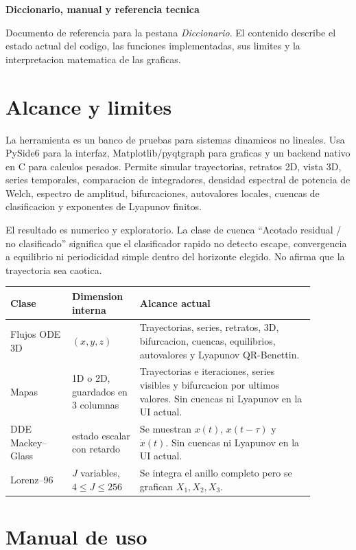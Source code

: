 \documentclass[11pt]{article}
\begin{document}
{\LARGE\bfseries Diccionario, manual y referencia tecnica}\par
{\small Documento de referencia para la pestana \emph{Diccionario}. El contenido describe el estado actual del codigo, las funciones implementadas, sus limites y la interpretacion matematica de las graficas.}\par
\vspace{0.8em}
\tableofcontents
\newpage

\section{Alcance y limites}

La herramienta es un banco de pruebas para sistemas dinamicos no lineales. Usa PySide6 para la interfaz, Matplotlib/pyqtgraph para graficas y un backend nativo en C para calculos pesados. Permite simular trayectorias, retratos 2D, vista 3D, series temporales, comparacion de integradores, densidad espectral de potencia de Welch, espectro de amplitud, bifurcaciones, autovalores locales, cuencas de clasificacion y exponentes de Lyapunov finitos.

El resultado es numerico y exploratorio. La clase de cuenca ``Acotado residual / no clasificado'' significa que el clasificador rapido no detecto escape, convergencia a equilibrio ni periodicidad simple dentro del horizonte elegido. No afirma que la trayectoria sea caotica.

\begin{longtable}{p{0.18\linewidth}p{0.19\linewidth}p{0.51\linewidth}}
\toprule
Clase & Dimension interna & Alcance actual \\
\midrule
\endhead
Flujos ODE 3D & $(x,y,z)$ & Trayectorias, series, retratos, 3D, bifurcacion, cuencas, equilibrios, autovalores y Lyapunov QR-Benettin. \\
Mapas & 1D o 2D, guardados en 3 columnas & Trayectorias e iteraciones, series visibles y bifurcacion por ultimos valores. Sin cuencas ni Lyapunov en la UI actual. \\
DDE Mackey--Glass & estado escalar con retardo & Se muestran $x(t)$, $x(t-\tau)$ y $\dot{x}(t)$. Sin cuencas ni Lyapunov en la UI actual. \\
Lorenz--96 & $J$ variables, $4\le J\le256$ & Se integra el anillo completo pero se grafican $X_1,X_2,X_3$. \\
\bottomrule
\end{longtable}

\section{Manual de uso}
\end{document}
